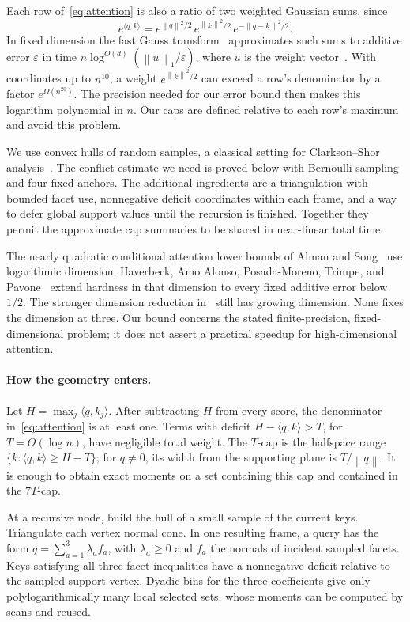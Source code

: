 \documentclass[notab,a4paper,UKenglish,numberwithinsect]{socg-lipics-v2021}
\newcommand{\ip}[2]{\langle #1,#2\rangle}
\newcommand{\eps}{\varepsilon}
\newcommand{\norm}[1]{\left\lVert #1\right\rVert}
\begin{document}
Each row of~\eqref{eq:attention} is also a ratio of two weighted Gaussian sums, since
\[
 e^{\ip qk}=e^{\norm q^2/2}\,e^{\norm k^2/2}\,e^{-\norm{q-k}^2/2}.
\]
In fixed dimension the fast Gauss transform~\cite{greengard-strain} approximates such sums to additive error $\eps$ in time $n\log^{O(d)}(\norm u_1/\eps)$, where $u$ is the weight vector~\cite[Theorem 2.1]{alman-chu}. With coordinates up to $n^{10}$, a weight $e^{\norm k^2/2}$ can exceed a row's denominator by a factor $e^{\Omega(n^{20})}$. The precision needed for our error bound then makes this logarithm polynomial in $n$. Our caps are defined relative to each row's maximum and avoid this problem.

We use convex hulls of random samples, a classical setting for Clarkson--Shor analysis~\cite{clarkson-shor}. The conflict estimate we need is proved below with Bernoulli sampling and four fixed anchors. The additional ingredients are a triangulation with bounded facet use, nonnegative deficit coordinates within each frame, and a way to defer global support values until the recursion is finished. Together they permit the approximate cap summaries to be shared in near-linear total time.

The nearly quadratic conditional attention lower bounds of Alman and Song~\cite[Theorem 1.3]{alman-song} use logarithmic dimension. Haverbeck, Amo Alonso, Posada-Moreno, Trimpe, and Pavone~\cite[Theorem 3.7]{haverbeck} extend hardness in that dimension to every fixed additive error below $1/2$. The stronger dimension reduction in~\cite[Theorem 1.4]{gupta} still has growing dimension. None fixes the dimension at three. Our bound concerns the stated finite-precision, fixed-dimensional problem; it does not assert a practical speedup for high-dimensional attention.

\paragraph*{How the geometry enters.}
Let $H=\max_j\ip q{k_j}$. After subtracting $H$ from every score, the denominator in~\eqref{eq:attention} is at least one. Terms with deficit $H-\ip qk>T$, for $T=\Theta(\log n)$, have negligible total weight. The $T$-cap is the halfspace range $\{k:\ip qk\ge H-T\}$; for $q\ne0$, its width from the supporting plane is $T/\norm q$. It is enough to obtain exact moments on a set containing this cap and contained in the $7T$-cap.

At a recursive node, build the hull of a small sample of the current keys. Triangulate each vertex normal cone. In one resulting frame, a query has the form $q=\sum_{a=1}^3\lambda_a f_a$, with $\lambda_a\ge0$ and $f_a$ the normals of incident sampled facets. Keys satisfying all three facet inequalities have a nonnegative deficit relative to the sampled support vertex. Dyadic bins for the three coefficients give only polylogarithmically many local selected sets, whose moments can be computed by scans and reused.
\end{document}
